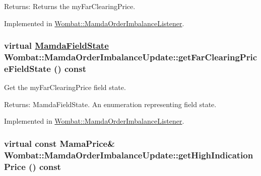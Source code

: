 \begin{Desc}
\item[Returns:]Returns the my\-Far\-Clearing\-Price. \end{Desc}


Implemented in \hyperlink{classWombat_1_1MamdaOrderImbalanceListener_f794cdda271d04cc569e18222146e3a6}{Wombat::Mamda\-Order\-Imbalance\-Listener}.\hypertarget{classWombat_1_1MamdaOrderImbalanceUpdate_cc4cf8bd45eb1af821b968df791b0dd2}{
\subsubsection[getFarClearingPriceFieldState]{\setlength{\rightskip}{0pt plus 5cm}virtual \hyperlink{namespaceWombat_93aac974f2ab713554fd12a1fa3b7d2a}{Mamda\-Field\-State} Wombat::Mamda\-Order\-Imbalance\-Update::get\-Far\-Clearing\-Price\-Field\-State () const}}
\label{classWombat_1_1MamdaOrderImbalanceUpdate_cc4cf8bd45eb1af821b968df791b0dd2}


Get the my\-Far\-Clearing\-Price field state. 

\begin{Desc}
\item[Returns:]Mamda\-Field\-State. An enumeration representing field state. \end{Desc}


Implemented in \hyperlink{classWombat_1_1MamdaOrderImbalanceListener_9a23b7703628b621deed5abcbc1b0e97}{Wombat::Mamda\-Order\-Imbalance\-Listener}.\hypertarget{classWombat_1_1MamdaOrderImbalanceUpdate_dab7a8dbc6e204f1d9221a386b4dceb6}{
\subsubsection[getHighIndicationPrice]{\setlength{\rightskip}{0pt plus 5cm}virtual const Mama\-Price\& Wombat::Mamda\-Order\-Imbalance\-Update::get\-High\-Indication\-Price () const}}
\label{classWombat_1_1MamdaOrderImbalanceUpdate_dab7a8dbc6e204f1d9221a386b4dceb6}


